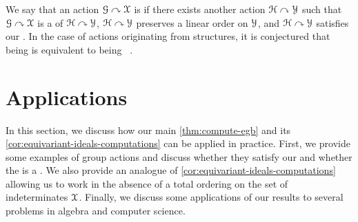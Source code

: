 \AP We say that an action $\mathcal{G}\curvearrowright\mathcal{X}$ is  if
there exists another action $\mathcal{H}\curvearrowright\mathcal{Y}$ such that $\mathcal{G}\curvearrowright\mathcal{X}$
is a  of $\mathcal{H}\curvearrowright\mathcal{Y}$, $\mathcal{H}\curvearrowright\mathcal{Y}$ preserves a linear order
on $\mathcal{Y}$, and $\mathcal{H} \curvearrowright \mathcal{Y}$ satisfies our . In
the case of actions originating from  structures, it is
conjectured that being  is equivalent to being ~\cite[Problems 12]{POUZ24}.

\section{Applications}
\label{sec:app}

\AP In this section, we discuss how our main \cref{thm:compute-egb} and its
\cref{cor:equivariant-ideals-computations} can be applied in practice. First,
we provide some examples of group actions and discuss whether they satisfy our
 and whether the  is a . We also provide an analogue of
\cref{cor:equivariant-ideals-computations} allowing us to work in the absence
of a total ordering on the set of indeterminates $\mathcal{X}$. Finally, we discuss
some applications of our results to several problems in algebra and computer
science.